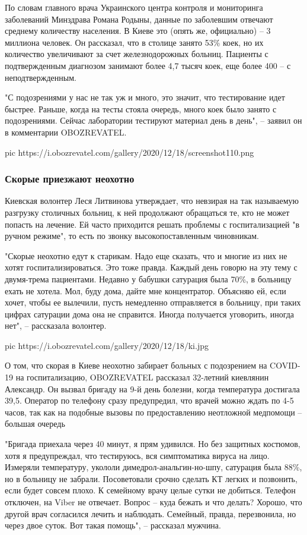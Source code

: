 По словам главного врача Украинского центра контроля и мониторинга заболеваний
Минздрава Романа Родыны, данные по заболевшим отвечают среднему количеству
населения. В Киеве это (опять же, официально) – 3 миллиона человек. Он
рассказал, что в столице занято 53\% коек, но их количество увеличивают за счет
железнодорожных больниц. Пациенты с подтвержденным диагнозом занимают более 4,7
тысяч коек, еще более 400 – с неподтвержденным.

"С подозрениями у нас не так уж и много, это значит, что тестирование идет
быстрее. Раньше, когда на тесты стояла очередь, много коек было занято с
подозрениями. Сейчас лаборатории тестируют материал день в день", – заявил он в
комментарии OBOZREVATEL.

\ifcmt
pic https://i.obozrevatel.com/gallery/2020/12/18/screenshot110.png
\fi

\subsubsection{Скорые приезжают неохотно}

Киевская волонтер Леся Литвинова утверждает, что невзирая на так называемую
разгрузку столичных больниц, к ней продолжают обращаться те, кто не может
попасть на лечение. Ей часто приходится решать проблемы с госпитализацией "в
ручном режиме", то есть по звонку высокопоставленным чиновникам.

"Скорые неохотно едут к старикам. Надо еще сказать, что и многие из них не
хотят госпитализироваться. Это тоже правда. Каждый день говорю на эту тему с
двумя-трема пациентами. Недавно у бабушки сатурация была 70\%, в больницу ехать
не хотела. Мол, буду дома, дайте мне концентратор. Объясняю ей, если хочет,
чтобы ее вылечили, пусть немедленно отправляется в больницу, при таких цифрах
сатурации дома она не справится. Иногда получается уговорить, иногда нет", –
рассказала волонтер.

\ifcmt
pic https://i.obozrevatel.com/gallery/2020/12/18/ki.jpg
\fi

О том, что скорая в Киеве неохотно забирает больных с подозрением на COVID-19
на госпитализацию, OBOZREVATEL рассказал 32-летний киевлянин Александр. Он
вызвал бригаду на 9-й день болезни, когда температура достигала 39,5. Оператор
по телефону сразу предупредил, что врачей можно ждать по 4-5 часов, так как на
подобные вызовы по предоставлению неотложной медпомощи – большая очередь

"Бригада приехала через 40 минут, я прям удивился. Но без защитных костюмов,
хотя я предупреждал, что тестируюсь, вся симптоматика вируса на лицо. Измеряли
температуру, укололи димедрол-анальгин-но-шпу, сатурация была 88\%, но в
больницу не забрали. Посоветовали срочно сделать КТ легких и позвонить, если
будет совсем плохо. К семейному врачу целые сутки не добиться. Телефон
отключен, на Viber не отвечает. Вопрос – куда бежать и что делать? Хорошо, что
другой врач согласился лечить и наблюдать. Семейный, правда, перезвонила, но
через двое суток. Вот такая помощь", – рассказал мужчина.

